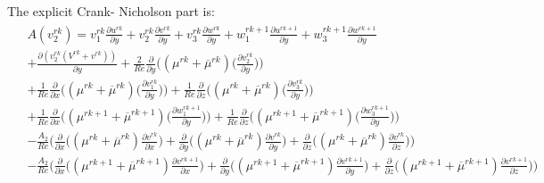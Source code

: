 \documentclass[preprint,12pt]{article}
\begin{document}
The explicit Crank- Nicholson part is:
\begin{align}\begin{split}
&A(v_2^{rk})=v_1^{rk}\frac{\partial u^{rk}}{\partial y}+v_2^{rk}\frac{\partial v^{rk}}{\partial y}+v_3^{rk}\frac{\partial w^{rk}}{\partial y}+w_1^{rk+1}\frac{\partial u^{rk+1}}{\partial y}+w_3^{rk+1}\frac{\partial w^{rk+1}}{\partial y}\\&+\frac{\partial (v_2^{rk}(V^{rk}+v^{rk}))}{\partial y}+\frac{2}{Re}\frac{\partial}{\partial y}\Big(({\mu}^{rk}+\overline{\mu}^{rk})\Big(\frac{\partial v_2^{rk}}{\partial y}\Big)\Big)\\&+\frac{1}{Re}\frac{\partial}{\partial x}\Big(({\mu}^{rk}+\overline{\mu}^{rk})\Big(\frac{\partial v_1^{rk}}{\partial y}\Big)\Big)+\frac{1}{Re}\frac{\partial}{\partial z}\Big(({\mu}^{rk}+\overline{\mu}^{rk})\Big(\frac{\partial v_3^{rk}}{\partial y}\Big)\Big)\\&+\frac{1}{Re}\frac{\partial}{\partial x}\Big(({\mu}^{rk+1}+\overline{\mu}^{rk+1})\Big(\frac{\partial w_1^{rk+1}}{\partial y}\Big)\Big)+\frac{1}{Re}\frac{\partial}{\partial z}\Big(({\mu}^{rk+1}+\overline{\mu}^{rk+1})\Big(\frac{\partial w_3^{rk+1}}{\partial y}\Big)\Big)\\&-\frac{A_2}{Re}\Bigg(\frac{\partial}{\partial x}\Big((\mu^{rk}+\overline{\mu}^{rk})\frac{\partial v^{rk}}{\partial x}\Big)+\frac{\partial}{\partial y}\Big((\mu^{rk}+\overline{\mu}^{rk})\frac{\partial v^{rk}}{\partial y}\Big)+\frac{\partial}{\partial z}\Big((\mu^{rk}+\overline{\mu}^{rk})\frac{\partial v^{rk}}{\partial z}\Big)\Bigg)\\&-\frac{A_2}{Re}\Bigg(\frac{\partial}{\partial x}\Big((\mu^{rk+1}+\overline{\mu}^{rk+1})\frac{\partial v^{rk+1}}{\partial x}\Big)+\frac{\partial}{\partial y}\Big((\mu^{rk+1}+\overline{\mu}^{rk+1})\frac{\partial v^{rk+1}}{\partial y}\Big)+\frac{\partial}{\partial z}\Big((\mu^{rk+1}+\overline{\mu}^{rk+1})\frac{\partial v^{rk+1}}{\partial z}\Big)\Bigg)
\end{split} \end{align}	
\end{document}
